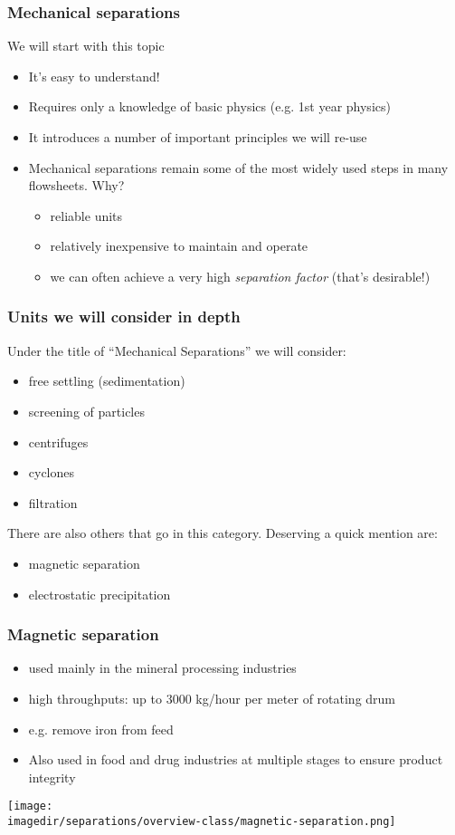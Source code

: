 \begin{frame}\frametitle{Mechanical separations}
	We will start with this topic
	\begin{itemize}
		\item	It's easy to understand!
		\item	Requires only a knowledge of basic physics (e.g. 1st year physics)
		\item	It introduces a number of important principles we will re-use 
		\item	Mechanical separations remain some of the most widely used steps in many flowsheets. Why?
		\begin{itemize}
			\item	reliable units
			\item	relatively inexpensive to maintain and operate
			\item	we can often achieve a very high \emph{\color{myOrange}separation factor} (that's desirable!)
		\end{itemize}
	\end{itemize}
\end{frame}

\begin{frame}\frametitle{Units we will consider in depth}
	Under the title of ``Mechanical Separations'' we will consider:
	\begin{itemize}
		\item	free settling (sedimentation)
		\item	screening of particles
		\item	centrifuges
		\item	cyclones
		\item	filtration
	\end{itemize}

	\vspace{12pt}
	There are also others that go in this category. Deserving a quick mention are:
	\begin{itemize}
		\item	magnetic separation
		\item	electrostatic precipitation
	\end{itemize}
\end{frame}

\begin{frame}\frametitle{{\color{myGreen}{Quick mention:}} Magnetic separation}
	\begin{itemize}
		\item	used mainly in the mineral processing industries
		\item	high throughputs: up to 3000 kg/hour per meter of rotating drum
		\item	e.g. remove iron from feed
		\item	Also used in food and drug industries at multiple stages to ensure product integrity
	\end{itemize}

	\begin{center}
		\texttt{[image: \\imagedir/separations/overview-class/magnetic-separation.png]}
	\end{center}
\end{frame}

